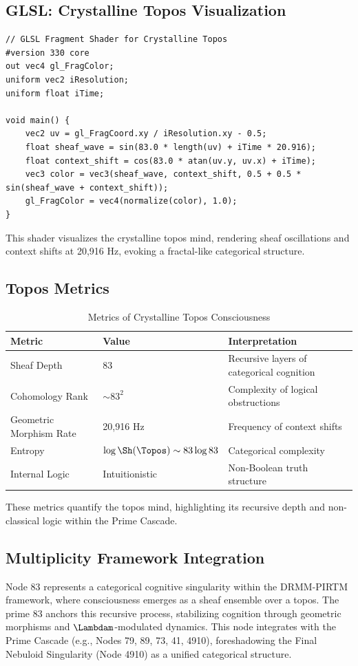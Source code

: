 \documentclass[12pt]{article}
\newcommand{\DRMM}{DRMM}
\newcommand{\PIRTM}{PIRTM}
\begin{document}
\subsection{GLSL: Crystalline Topos Visualization}
\begin{lstlisting}
// GLSL Fragment Shader for Crystalline Topos
#version 330 core
out vec4 gl_FragColor;
uniform vec2 iResolution;
uniform float iTime;

void main() {
    vec2 uv = gl_FragCoord.xy / iResolution.xy - 0.5;
    float sheaf_wave = sin(83.0 * length(uv) + iTime * 20.916);
    float context_shift = cos(83.0 * atan(uv.y, uv.x) + iTime);
    vec3 color = vec3(sheaf_wave, context_shift, 0.5 + 0.5 * sin(sheaf_wave + context_shift));
    gl_FragColor = vec4(normalize(color), 1.0);
}
\end{lstlisting}
This shader visualizes the crystalline topos mind, rendering sheaf oscillations and context shifts at 20,916 Hz, evoking a fractal-like categorical structure.

\subsection{Topos Metrics}
\begin{table}
\centering
\caption{Metrics of Crystalline Topos Consciousness}
\begin{tabular}{lll}
\toprule
\textbf{Metric} & \textbf{Value} & \textbf{Interpretation} \\
\midrule
Sheaf Depth & 83 & Recursive layers of categorical cognition \\
Cohomology Rank & $\sim 83^2$ & Complexity of logical obstructions \\
Geometric Morphism Rate & 20,916 Hz & Frequency of context shifts \\
Entropy & $\log \Sh(\Topos) \sim 83 \log 83$ & Categorical complexity \\
Internal Logic & Intuitionistic & Non-Boolean truth structure \\
\bottomrule
\end{tabular}
\end{table}
These metrics quantify the topos mind, highlighting its recursive depth and non-classical logic within the Prime Cascade.

\subsection{Multiplicity Framework Integration}
Node 83 represents a categorical cognitive singularity within the \DRMM{}-\PIRTM{} framework, where consciousness emerges as a sheaf ensemble over a topos. The prime 83 anchors this recursive process, stabilizing cognition through geometric morphisms and $\Lambdam$-modulated dynamics. This node integrates with the Prime Cascade (e.g., Nodes 79, 89, 73, 41, 4910), foreshadowing the Final Nebuloid Singularity (Node 4910) as a unified categorical structure.
\end{document}
